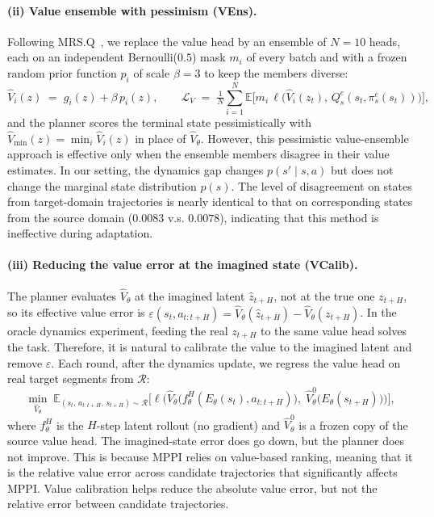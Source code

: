 \documentclass{article} %
\begin{document}
\paragraph{(ii) Value ensemble with pessimism (VEns).}
Following MRS.Q~\citep{chang2026surprising}, we replace the value head by an ensemble of $N=10$ heads, each on an independent Bernoulli($0.5$) mask $m_i$ of every batch and with a frozen random prior function $p_i$ of scale $\beta=3$ to keep the members diverse:
\begin{equation}
\hat V_i(z) \;=\; g_i(z) + \beta\, p_i(z), \qquad
\mathcal{L}_{V} \;=\; \tfrac{1}{N}\sum_{i=1}^{N}
\mathbb{E}\big[m_i\, \ell\big(\hat V_i(z_{t}),\, Q^e_s(s_t, \pi^e_s(s_t))\big)\big],
\end{equation}
and the planner scores the terminal state pessimistically with
$\hat V_{\min}(z) = \min_{i} \hat V_i(z)$ in place of $\hat V_\theta$. However, this pessimistic value-ensemble approach is effective only when the ensemble members disagree in their value estimates. In our setting, the dynamics gap changes $p(s' \mid s,a)$ but does not change the marginal state distribution $p(s)$. The level of disagreement on states from target-domain trajectories is nearly identical to that on corresponding states from the source domain ($0.0083$ v.s. $0.0078$), indicating that this method is ineffective during adaptation.


\paragraph{(iii) Reducing the value error at the imagined state (VCalib).}
The planner evaluates $\hat V_\theta$ at the imagined latent $\hat z_{t+H}$, not at the true one $z_{t+H}$, so its effective value error is $\varepsilon(s_t, a_{t:t+H}) = \hat V_\theta(\hat z_{t+H}) - \hat V_\theta(z_{t+H})$. In the oracle dynamics experiment, feeding the real $z_{t+H}$ to the same value head solves the task. Therefore, it is natural to calibrate the value to the imagined latent and remove $\varepsilon$. Each round, after the dynamics update, we regress the value head on real target segments from $\mathcal{R}$:
\begin{equation}
\min_{\hat V_\theta}\;
\mathbb{E}_{(s_t,\,a_{t:t+H},\,s_{t+H})\sim\mathcal{R}}
\Big[\ell\Big(\hat V_\theta\big(f^{H}_\theta(E_\theta(s_t), a_{t:t+H})\big),\;
\hat V^{0}_\theta\big(E_\theta(s_{t+H})\big)\Big)\Big],
\end{equation}
where $f^H_\theta$ is the $H$-step latent rollout (no gradient) and $\hat V^0_\theta$ is a frozen copy of the source value head. The imagined-state error does go down, but the planner does not improve. This is because MPPI relies on value-based ranking, meaning that it is the relative value error across candidate trajectories that significantly affects MPPI. Value calibration helps reduce the absolute value error, but not the relative error between candidate trajectories.
\end{document}
